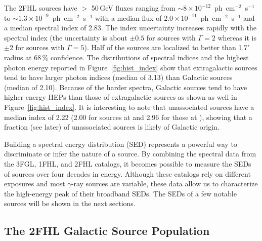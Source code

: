 The 2FHL sources have $>$ 50\,GeV fluxes ranging from
$\sim$$8\times 10^{-12}$~ph~cm$^{-2}$~s$^{-1}$ to $\sim$$1.3\times 10^{-9}$~ph~cm$^{-2}$~s$^{-1}$
with a median flux of  $2.0\times 10^{-11}$~ph~cm$^{-2}$~s$^{-1}$
and a median spectral index of 2.83. The index uncertainty increases rapidly with the spectral index (\eg the uncertainty is about
$\pm 0.5$ for sources with $\Gamma=2$ whereas it is 
$\pm 2$ for sources with $\Gamma=5$).
Half of the sources are localized to better than
1.7$'$ radius at 68\,\% confidence. 
The distributions of spectral indices and the highest photon energy reported in Figure~\ref{fig:hist_index} show that extragalactic sources tend to have larger photon indices (median of 3.13) than Galactic sources (median of 2.10).   Because of the harder spectra, Galactic sources tend to have higher-energy HEPs than those of extragalactic sources
as shown as well in Figure~\ref{fig:hist_index}.
It is interesting to note that unassociated sources have a median index of 2.22 (2.00 for  sources at \blat and 2.96 for those at \blot), showing that a fraction (see later) of unassociated sources is likely of Galactic origin. 

Building a spectral energy distribution (SED) represents a powerful way to discriminate or infer the nature of a source. By combining the spectral data from the 3FGL, 1FHL, and 2FHL catalogs, it becomes possible to measure the SEDs
of sources over four decades in energy. Although these catalogs rely on different exposures and  most $\gamma$-ray sources are variable, these data allow us to characterize the high-energy peak of their broadband SEDs. The SEDs of a few notable sources will be shown in the next sections.

%
%

\subsection{The 2FHL Galactic Source Population}\label{2fhl:GalPop}


